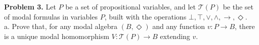 




{\bf Problem 3.} Let $P$ be a set of propositional variables, and let $\mathcal{T}(P)$ be the set of modal formulas in variables $P$, built with the operations $\bot, \top, \vee, \wedge, \to, \Diamond$.\\

a. Prove that, for any modal algebra $(B,\Diamond)$ and any function $v \colon P \to B$, there is a unique modal homomorphism $V \colon \mathcal{T}(P) \to B$ extending $v$.\\


